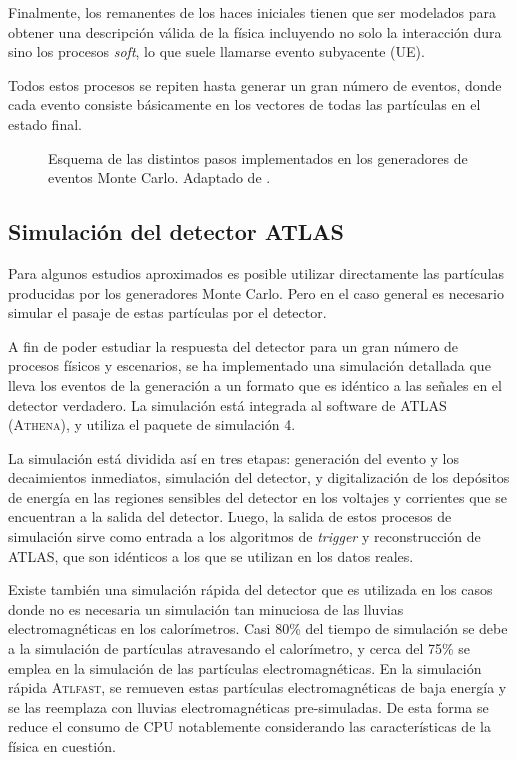 Finalmente, los remanentes de los haces iniciales tienen que ser modelados
para obtener una descripción válida de la física incluyendo no solo la
interacción dura sino los procesos \emph{soft}, lo que suele llamarse evento
subyacente (UE).

Todos estos procesos se repiten hasta generar un gran número de eventos, donde cada
evento consiste básicamente en los vectores de todas las partículas en el estado
final.


\begin{figure}[!h]
  \centering

  \scalebox{0.9}{}

  \caption{Esquema de las distintos pasos implementados en los generadores de
    eventos Monte Carlo. Adaptado de \cite{Baer:2009tk}.}
  \label{fig:mc_event_generator}

\end{figure}


\subsection{Simulación del detector ATLAS}
\label{sec:sim_atlas}

Para algunos estudios aproximados es posible utilizar directamente las
partículas producidas por los generadores Monte Carlo. Pero en el caso general
es necesario simular el pasaje de estas partículas por el detector.

A fin de poder estudiar la respuesta del detector para un gran número de procesos
físicos y escenarios, se ha implementado una simulación detallada que lleva los
eventos de la generación a un formato que es idéntico a las señales en el
detector verdadero\cite{AtlasSim}. La simulación está integrada al software de
ATLAS (\textsc{Athena}), y utiliza el paquete de simulación
{\geant}4\cite{Geant4}.

La simulación está dividida así en tres etapas: generación del evento y los
decaimientos inmediatos, simulación del detector, y digitalización de
los depósitos de energía en las regiones sensibles del detector en los voltajes
y corrientes que se encuentran a la salida del detector. Luego, la salida de
estos procesos de simulación sirve como entrada a los algoritmos de
\emph{trigger} y reconstrucción de ATLAS, que son idénticos a los que se utilizan en
los datos reales.

Existe también una simulación rápida del detector que es utilizada en los casos
donde no es necesaria un simulación tan minuciosa de las lluvias
electromagnéticas en los calorímetros. Casi 80\% del tiempo de simulación se
debe a la simulación de partículas atravesando el calorímetro, y cerca del 75\%
se emplea en la simulación de las partículas electromagnéticas. En la simulación
rápida \textsc{Atlfast}\cite{Richter-Was:683751}, se remueven estas partículas
electromagnéticas de baja energía y se las reemplaza con lluvias
electromagnéticas pre-simuladas. De esta forma se reduce el consumo de CPU
notablemente considerando las características de la física en cuestión.

